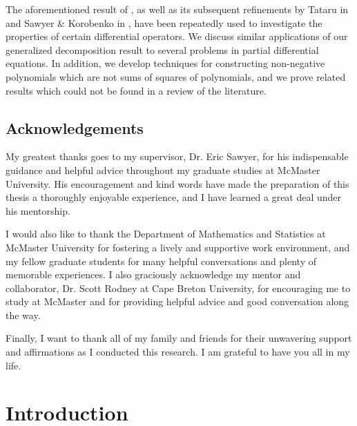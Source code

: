 \documentclass[oneside,hidelinks,indentfirst,10pt]{book}
\begin{document}
The aforementioned result of \cite{Fefferman-Phong}, as well as its subsequent refinements by Tataru in \cite{Tataru} and Sawyer \& Korobenko in \cite{SOS_I}, have been repeatedly used to investigate the properties of certain differential operators. We discuss similar applications of our generalized decomposition result to several problems in partial differential equations. In addition, we develop techniques for constructing non-negative polynomials which are not sums of squares of polynomials, and we prove related results which could not be found in a review of the literature.


\newpage


\section*{\Huge Acknowledgements}
My greatest thanks goes to my supervisor, Dr. Eric Sawyer, for his indispensable guidance and helpful advice throughout my graduate studies at McMaster University. His encouragement and kind words have made the preparation of this thesis a thoroughly enjoyable experience, and I have learned a great deal under his mentorship.

I would also like to thank the Department of Mathematics and Statistics at McMaster University for fostering a lively and supportive work environment, and my fellow graduate students for many helpful conversations and plenty of memorable experiences. I also graciously acknowledge my mentor and collaborator, Dr. Scott Rodney at Cape Breton University, for encouraging me to study at McMaster and for providing helpful advice and good conversation along the way. 

Finally, I want to thank all of my family and friends for their unwavering support and affirmations as I conducted this research. I am grateful to have you all in my life.
\newpage


\setcounter{tocdepth}{1}
\tableofcontents
\label{lastoffront}
\mainmatter
\newpage
\pagestyle{thesis}
\chapter{Introduction}\label{chap:intro}
\end{document}
